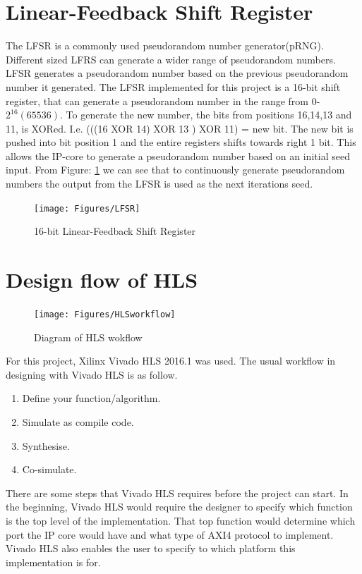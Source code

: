 \section{Linear-Feedback Shift Register}
The LFSR is a commonly used pseudorandom number generator(pRNG)\citep{murase1992linear}. Different sized LFRS can generate a wider range of pseudorandom numbers. LFSR generates a pseudorandom number based on the previous pseudorandom number it generated. The LFSR implemented for this project is a 16-bit shift register, that can generate a pseudorandom number in the range from 0-$2^{16}(65536)$. To generate the new number, the bits from positions 16,14,13 and 11, is XORed. I.e. (((16 XOR 14) XOR 13 ) XOR 11) = new bit. The new bit is pushed into bit position 1 and the entire registers shifts towards right 1 bit. 
This allows the IP-core to generate a pseudorandom number based on an initial seed input. From Figure: \ref{fig:LFSR} we can see that to continuously generate pseudorandom numbers the output from the LFSR is used as the next iterations seed. 

\begin{figure} 
\texttt{[image: Figures/LFSR]}
\caption{16-bit Linear-Feedback Shift Register}
    \label{fig:LFSR}
\end{figure}




\section{Design flow of HLS}

\begin{figure}
\texttt{[image: Figures/HLSworkflow]}
\caption{Diagram of HLS wokflow}
    \label{fig:hlsworkflow}
\end{figure}


For this project, Xilinx Vivado HLS 2016.1 was used. The usual workflow in designing with Vivado HLS is as follow. 

\begin{enumerate}
\item Define your function/algorithm.
\item Simulate as compile code. 
\item Synthesise.
\item Co-simulate.
\end{enumerate}


There are some steps that Vivado HLS requires before the project can start. In the beginning, Vivado HLS would require the designer to specify which function is the top level of the implementation. That top function would determine which port the IP core would have and what type of AXI4 protocol to implement. Vivado HLS also enables the user to specify to which platform this implementation is for.


